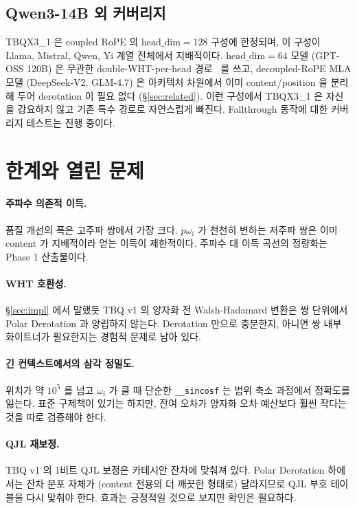 \documentclass[10pt,twocolumn]{article}
\begin{document}
\subsection{Qwen3-14B 외 커버리지}

TBQX3\_1 은 coupled RoPE 의 $\text{head\_dim}=128$ 구성에 한정되며, 이 구성이 Llama, Mistral, Qwen, Yi 계열 전체에서 지배적이다. $\text{head\_dim}=64$ 모델 (GPT-OSS 120B) 은 무관한 double-WHT-per-head 경로~\cite{turboquant_impl2026} 를 쓰고, decoupled-RoPE MLA 모델 (DeepSeek-V2, GLM-4.7) 은 아키텍처 차원에서 이미 content/position 을 분리해 두어 derotation 이 필요 없다 (\S\ref{sec:related}). 이런 구성에서 TBQX3\_1 은 자신을 강요하지 않고 기존 특수 경로로 자연스럽게 빠진다. Fallthrough 동작에 대한 커버리지 테스트는 진행 중이다.

\section{한계와 열린 문제}
\label{sec:limitations}

\paragraph{주파수 의존적 이득.}
품질 개선의 폭은 고주파 쌍에서 가장 크다. $p\omega_i$ 가 천천히 변하는 저주파 쌍은 이미 content 가 지배적이라 얻는 이득이 제한적이다. 주파수 대 이득 곡선의 정량화는 Phase 1 산출물이다.

\paragraph{WHT 호환성.}
\S\ref{sec:impl} 에서 말했듯 TBQ v1 의 양자화 전 Walsh-Hadamard 변환은 쌍 단위에서 Polar Derotation 과 양립하지 않는다. Derotation 만으로 충분한지, 아니면 쌍 내부 화이트너가 필요한지는 경험적 문제로 남아 있다.

\paragraph{긴 컨텍스트에서의 삼각 정밀도.}
위치가 약 $10^5$ 를 넘고 $\omega_i$ 가 클 때 단순한 \texttt{\_\_sincosf} 는 범위 축소 과정에서 정확도를 잃는다. 표준 구제책이 있기는 하지만, 잔여 오차가 양자화 오차 예산보다 훨씬 작다는 것을 따로 검증해야 한다.

\paragraph{QJL 재보정.}
TBQ v1 의 1비트 QJL 보정은 카테시안 잔차에 맞춰져 있다. Polar Derotation 하에서는 잔차 분포 자체가 (content 전용의 더 깨끗한 형태로) 달라지므로 QJL 부호 테이블을 다시 맞춰야 한다. 효과는 긍정적일 것으로 보지만 확인은 필요하다.
\end{document}
